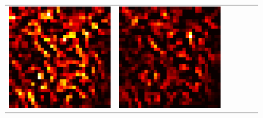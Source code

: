 \documentclass[preprint,12pt]{elsarticle}
\begin{document}
\begin{figure}[p]
\begin{tabular}{cccccc}
  \includegraphics[scale=\scale]{../visualizations/examples/cifar10/resnet18/positive_saliency_map/5.png} & 
  \includegraphics[scale=\scale]{../visualizations/examples/cifar10/resnet18/negative_saliency_map/5.png} & 

\end{tabular}
\end{figure}
\end{document}
